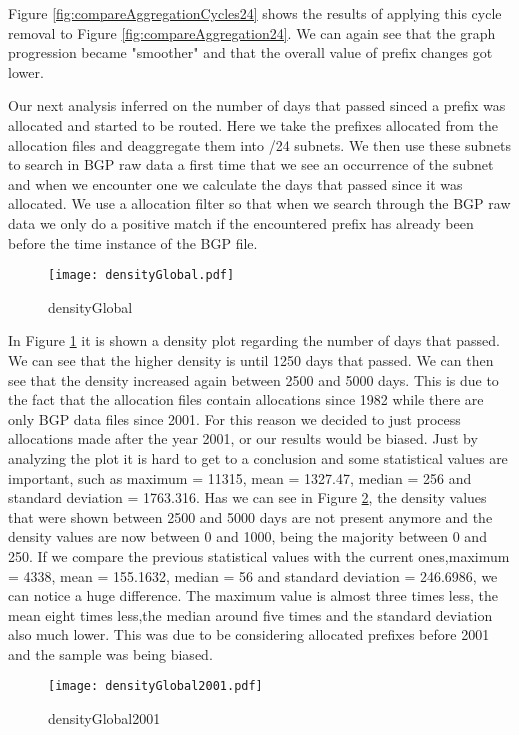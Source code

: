 \documentclass[11pt,a4paper]{scrreprt}
\begin{document}
Figure \ref{fig:compareAggregationCycles24} shows the results of applying this cycle removal to Figure \ref{fig:compareAggregation24}. We can again see that the graph progression became "smoother" and that the overall value of prefix changes got lower. 

Our next analysis inferred on the number of days that passed sinced a prefix was allocated and started to be routed. Here we take the prefixes allocated from the allocation files and deaggregate them into /24 subnets. We then use these subnets to search in BGP raw data a first time that we see an occurrence of the subnet and when we encounter one we calculate the days that passed since it was allocated. We use a allocation filter so that when we search through the BGP raw data we only do a positive match if the encountered prefix has already been before the time instance of the BGP file.  

\begin{figure}[ht!]
\centering
\texttt{[image: densityGlobal.pdf]}
\caption{densityGlobal}
\label{fig:densityGlobal}
\end{figure}

In Figure \ref{fig:densityGlobal} it is shown a density plot regarding the number of days that passed. We can see that the higher density is until 1250 days that passed. We can then see that the density increased again between 2500 and 5000 days. This is due to the fact that the allocation files contain allocations since 1982 while there are only BGP data files since 2001. For this reason we decided to just process allocations made after the year 2001, or our results would be biased. Just by analyzing the plot it is hard to get to a conclusion and some statistical values are important, such as maximum = 11315, mean = 1327.47, median = 256 and standard deviation = 1763.316. 
Has we can see in Figure \ref{fig:densityGlobal2001}, the density values that were shown between 2500
and 5000 days  are not present anymore and the density values are now between 0 and 1000, being the majority between 0 and 250. If we compare the previous statistical values with the current ones,maximum = 4338, mean = 155.1632, median = 56 and standard deviation = 246.6986, we can notice a huge difference. The maximum value is almost three times less, the mean eight times less,the median around five times and the standard deviation also much lower. This was due to be considering allocated prefixes before 2001 and the sample was being biased.

\begin{figure}[ht!]
\centering
\texttt{[image: densityGlobal2001.pdf]}
\caption{densityGlobal2001}
\label{fig:densityGlobal2001}
\end{figure}
\end{document}
